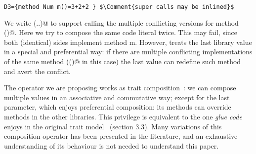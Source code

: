 \saveSpace
\begin{lstlisting}
D3={method Num m()=3+2+2 } $\Comment{super calls may be inlined}$
\end{lstlisting}
\saveSpace

We write (..)@ to support calling the multiple conflicting versions
for method \Q@m()@.
Here we try to compose the same code literal twice.
This may fail, since both (identical) sides implement method m.
However, \Q@Override@ treats the last library value in a special
 and preferential way:
if there are multiple conflicting implementations of the same method 
(\Q@m()@ in this case)
the last value can redefine such method and avert the conflict.

The \Q@Override@ operator we are proposing works as 
trait composition~\cite{scharli2003traits}:
we can compose multiple \Q@Library@ values in
an associative and commutative way;
except for the last parameter, which
enjoys preferential composition:
its methods can override methods in the other
libraries. This privilege is equivalent to the 
one \emph{glue code} enjoys in the original trait model 
~\cite{scharli2003traits}(section 3.3).
Many variations of this composition operator has been presented in the literature,
and an exhaustive understanding of its behaviour is not needed to
understand this paper.

